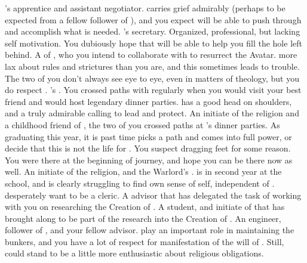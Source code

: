 \documentclass[char]{GL2020}
\begin{document}
\begin{contacts}
    \contact{\cJuniorStatesman{}} \cHeadDiplomat{}'s apprentice and assistant negotiator. \cJuniorStatesman{} carries \cJuniorStatesman{\their} grief admirably (perhaps to be expected from a fellow follower of \cEbb{}), and you expect \cJuniorStatesman{\they} will be able to push through and accomplish what is needed. 
    \contact{\cChupLeader{}} \cHeadDiplomat{}'s secretary. Organized, professional, but lacking self motivation. You dubiously hope that \cChupLeader{\they} will be able to help you fill the hole \cHeadDiplomat{} left behind.
    \contact{\cFlowPriest{}} A \cFlowPriest{\cleric} of \cFlow{}, who you intend to collaborate with to resurrect the \cEbb{} Avatar. \cFlowPriest{\Theyare} more lax about rules and strictures than you are, and this sometimes leads to trouble. The two of you don't always see eye to eye, even in matters of theology, but you do respect \cFlowPriest{\them}.
    \contact{\cPresident{}} \cHeadDiplomat{}’s \cPresident{\nibling}. You crossed paths with \cPresident{\them} regularly when you would visit your best friend and \cHeadDiplomat{} would host \cHeadDiplomat{\their} legendary dinner parties. \cPresident{} has a good head on \cPresident{\their} shoulders, and a truly admirable calling to lead and protect.
    \contact{\cInitiate{}} An initiate of the \pShippie{} religion and a childhood friend of \cPresident{}, the two of you crossed paths at \cHeadDiplomat{}’s dinner parties. As \cInitiate{\theyare} graduating this year, it is past time \cInitiate{} picks a path and comes into \cInitiate{\their} full power, or decide that this is not the life for \cInitiate{\them}. You suspect \cInitiate{\theyare} dragging \cInitiate{\their} feet for some reason. You were there at the beginning of \cInitiate{\their} journey, and hope you can be there now as well.                
     \contact{\cWarlordDaughter{}} An initiate of the \pShippie{} religion, and the Warlord's \cWarlordDaughter{\offspring}. \cWarlordDaughter{} is in \cWarlordDaughter{\their} second year at the school, and is clearly struggling to find \cWarlordDaughter{\their} own sense of self, independent of \cWarlordDaughter{\their} \cLoud{\parent}. \cWarlordDaughter{\They} desperately want\cWarlordDaughter{\verbs} to be a cleric. 
    \contact{\cHeadScientist{}} A \pTech{} advisor that \cBeetle{} has delegated the task of working with you on researching the Creation of \pEarth{}.
    \contact{\cScholarship{}} A \pTech{} student, and initiate of \cTechGod{} that \cHeadScientist{} has brought along to be part of the research into the Creation of \pEarth{}.
    \contact{\cBunker{}} An engineer, follower of \cEbb{}, and your fellow advisor. \cBunker{\They} play\cBunker{\verbs} an important role in maintaining the bunkers, and you have a lot of respect for \cBunker{\their} manifestation of the will of \cEbb{}. Still, \cBunker{\they} could stand to be a little more enthusiastic about \cBunker{\their} religious obligations.
\end{contacts}
\end{document}
